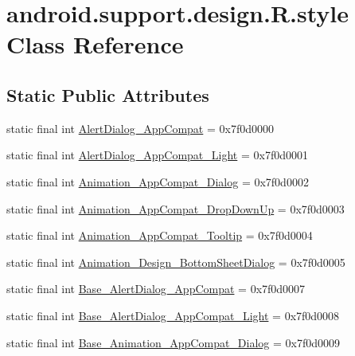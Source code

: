 \hypertarget{classandroid_1_1support_1_1design_1_1_r_1_1style}{}\section{android.\+support.\+design.\+R.\+style Class Reference}
\label{classandroid_1_1support_1_1design_1_1_r_1_1style}
\subsection*{Static Public Attributes}
\begin{DoxyCompactItemize}
\item 
static final int \mbox{\hyperlink{classandroid_1_1support_1_1design_1_1_r_1_1style_a18ec447211099976a5704ae5d237795a}{Alert\+Dialog\+\_\+\+App\+Compat}} = 0x7f0d0000
\item 
static final int \mbox{\hyperlink{classandroid_1_1support_1_1design_1_1_r_1_1style_a5fc28cfb8b777b79c8190cd259a037c1}{Alert\+Dialog\+\_\+\+App\+Compat\+\_\+\+Light}} = 0x7f0d0001
\item 
static final int \mbox{\hyperlink{classandroid_1_1support_1_1design_1_1_r_1_1style_afc859831d6bcff267de3ceda0de4d65d}{Animation\+\_\+\+App\+Compat\+\_\+\+Dialog}} = 0x7f0d0002
\item 
static final int \mbox{\hyperlink{classandroid_1_1support_1_1design_1_1_r_1_1style_ae65c69c112be812a18d7f16d15c8a099}{Animation\+\_\+\+App\+Compat\+\_\+\+Drop\+Down\+Up}} = 0x7f0d0003
\item 
static final int \mbox{\hyperlink{classandroid_1_1support_1_1design_1_1_r_1_1style_a7ef015e5a7675bd78e360a7be18a41e1}{Animation\+\_\+\+App\+Compat\+\_\+\+Tooltip}} = 0x7f0d0004
\item 
static final int \mbox{\hyperlink{classandroid_1_1support_1_1design_1_1_r_1_1style_ab2b82a0c45a4a4e33b8d7151fcb26db5}{Animation\+\_\+\+Design\+\_\+\+Bottom\+Sheet\+Dialog}} = 0x7f0d0005
\item 
static final int \mbox{\hyperlink{classandroid_1_1support_1_1design_1_1_r_1_1style_a3478a35666043a8e87309030935f5a60}{Base\+\_\+\+Alert\+Dialog\+\_\+\+App\+Compat}} = 0x7f0d0007
\item 
static final int \mbox{\hyperlink{classandroid_1_1support_1_1design_1_1_r_1_1style_ae0afd65daccda54e3d8a57251bbf0c38}{Base\+\_\+\+Alert\+Dialog\+\_\+\+App\+Compat\+\_\+\+Light}} = 0x7f0d0008
\item 
static final int \mbox{\hyperlink{classandroid_1_1support_1_1design_1_1_r_1_1style_a92600d437c660a5b33479eca5df7375c}{Base\+\_\+\+Animation\+\_\+\+App\+Compat\+\_\+\+Dialog}} = 0x7f0d0009

\end{DoxyCompactItemize}
